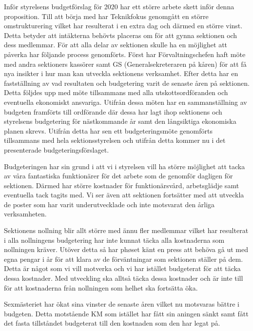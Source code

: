 \documentclass[../_main/handlingar.tex]{subfiles}
\begin{document}

Inför styrelsens budgetförslag för 2020 har ett större arbete skett inför denna proposition.
Till att börja med har Teknikfokus genomgått en större omstrukturering vilket har resulterat i en extra dag och därmed en större vinst. Detta betyder att intäkterna behövts placeras om för att gynna sektionen och dess medlemmar.
För att alla delar av sektionen skulle ha en möjlighet att påverka har följande process genomförts.
Först har Förvaltningschefen haft möte med andra sektioners kassörer samt GS (Generalsekreteraren på kåren) för att få nya insikter i hur man kan utveckla sektionens verksamhet. 
Efter detta har en fastställning av vad resultaten och budgetering varit de senaste åren på sektionen. 
Detta följdes upp med möte tillsammans med alla utskottsordföranden och eventuella ekonomiskt ansvariga. Utifrån dessa möten har en sammanställning av budgeten framförts till ordförande där dessa har lagt ihop sektionens och styrelsens budgetering för nästkommande år samt den långsiktiga ekonomiska planen skrevs. 
Utifrån detta har sen ett budgeteringsmöte genomförts tillsammans med hela sektionsstyrelsen och utifrån detta kommer nu i det presenterade budgeteringsförslaget.

Budgeteringen har sin grund i att vi i styrelsen vill ha större möjlighet att tacka av våra fantastiska funktionärer för det arbete som de genomför dagligen för sektionen. Därmed har större kostnader för funktionärsvård, arbetsglädje samt eventuella tack tagits med.
Vi ser även att sektionen fortsätter med att utveckla de poster som har varit underutvecklade och inte motsvarat den årliga verksamheten.

Sektionens nollning blir allt större med ännu fler medlemmar vilket har resulterat i alla nollningens budgetering har inte kunnat täcka alla kostnaderna som nollningen kräver. Utöver detta så har phøset känt en press att behöva gå ut med egna pengar i år för att klara av de förväntningar som sektionen ställer på dem. Detta är något som vi vill motverka och vi har istället budgeterat för att täcka dessa kostnader. Med utveckling ska alltså täcka dessa kostnader och är inte till för att kostnaderna från nollningen som helhet ska fortsätta öka.

Sexmästeriet har ökat sina vinster de senaste åren vilket nu motsvaras bättre i budgeten. Detta motstående KM som istället har fått sin aningen sänkt samt fått det fasta tillståndet budgeterat till den kostnaden som den har legat på.
\end{document}
